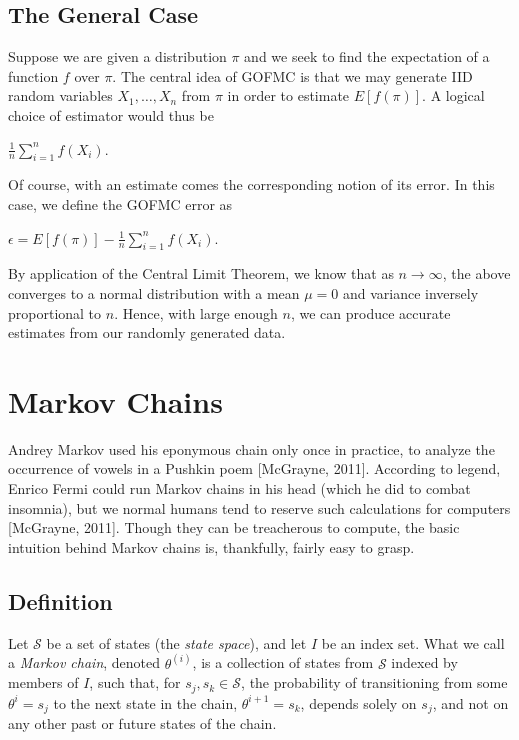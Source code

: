 \documentclass[12pt,twoside]{reedthesis}
\begin{document}
		\subsection*{The General Case}
			Suppose we are given a distribution $\pi$ and we seek to find the expectation of a function $f$ over $\pi$. The central idea of GOFMC is that we may generate IID random variables $X_1, \ldots, X_n$ from $\pi$ in order to estimate $E[f(\pi)]$. A logical choice of estimator would thus be
			\begin{center}
				$\displaystyle\frac{1}{n}\displaystyle\sum_{i=1}^{n}{f(X_i)}$.
			\end{center}		
			Of course, with an estimate comes the corresponding notion of its error. 
			In this case, we define the GOFMC error as
			\begin{center}
				$\epsilon = E[f(\pi)] - \displaystyle\frac{1}{n}\displaystyle\sum_{i=1}^{n}f(X_i)$.
			\end{center}
			By application of the Central Limit Theorem, we know that as $n \rightarrow \infty$, the above converges to a normal distribution with a mean $\mu = 0$ and variance inversely proportional to $n$.
			Hence, with large enough $n$, we can produce accurate estimates from our randomly generated data. 
	\section{Markov Chains}
	Andrey Markov used his eponymous chain only once in practice, to analyze the occurrence of vowels in a Pushkin poem [McGrayne, 2011]. According to legend, Enrico Fermi could run Markov chains in his head (which he did to combat insomnia), but we normal humans tend to reserve such calculations for computers [McGrayne, 2011]. Though they can be treacherous to compute, the basic intuition behind Markov chains is, thankfully, fairly easy to grasp.
	 
	 			\subsection*{Definition}
			Let $\mathcal S$ be a set of states (the {\em state space}), and let $I$ be an index set. What we call a {\em Markov chain}, denoted $\theta^{(i)}$, is a collection of states from $\mathcal S$ indexed by members of $I$, such that, for $s_j, s_k \in \mathcal S$, the probability of transitioning from some $\theta^i = s_j$ to the next state in the chain, $\theta^{i+1} = s_k$, depends solely on $s_j$, and not on any other past or future states of the chain. 
			
\end{document}
